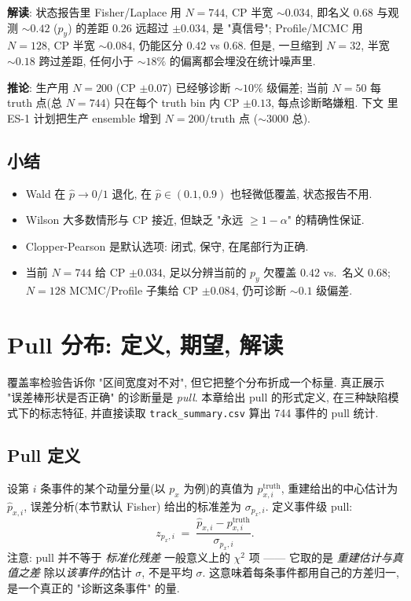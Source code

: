 \textbf{解读}: 状态报告里 Fisher/Laplace 用 $N=744$, CP 半宽 $\sim 0.034$, 即名义 0.68 与观测 $\sim 0.42$ ($p_y$) 的差距 $0.26$ 远超过 $\pm 0.034$, 是 "真信号"; Profile/MCMC 用 $N=128$, CP 半宽 $\sim 0.084$, 仍能区分 $0.42$ vs $0.68$. 但是, 一旦缩到 $N=32$, 半宽 $\sim 0.18$ 跨过差距, 任何小于 $\sim 18\%$ 的偏离都会埋没在统计噪声里.

\textbf{推论}: 生产用 $N=200$ (CP $\pm 0.07$) 已经够诊断 $\sim 10\%$ 级偏差; 当前 $N=50$ 每 truth 点(总 $N=744$) 只在每个 truth bin 内 CP $\pm 0.13$, 每点诊断略嫌粗. 下文  里 ES-1 计划把生产 ensemble 增到 $N=200$/truth 点 ($\sim 3000$ 总).

\subsection{小结}
\label{sec:partIII:coverage_methodology:summary}

\begin{itemize}[nosep]
  \item Wald 在 $\hat p \to 0/1$ 退化, 在 $\hat p \in (0.1, 0.9)$ 也轻微低覆盖, 状态报告不用.
  \item Wilson 大多数情形与 CP 接近, 但缺乏 "永远 $\ge 1 - \alpha$" 的精确性保证.
  \item Clopper-Pearson 是默认选项: 闭式, 保守, 在尾部行为正确.
  \item 当前 $N=744$ 给 CP $\pm 0.034$, 足以分辨当前的 $p_y$ 欠覆盖 $0.42$ vs.\ 名义 $0.68$; $N=128$ MCMC/Profile 子集给 CP $\pm 0.084$, 仍可诊断 $\sim 0.1$ 级偏差.
\end{itemize}


\section{Pull 分布: 定义, 期望, 解读}
\label{sec:partIII:pulls}

覆盖率检验告诉你 "区间宽度对不对", 但它把整个分布折成一个标量. 真正展示 "误差棒形状是否正确" 的诊断量是 \emph{pull}. 本章给出 pull 的形式定义, 在三种缺陷模式下的标志特征, 并直接读取 \texttt{track\_summary.csv} 算出 744 事件的 pull 统计.

\subsection{Pull 定义}
\label{sec:partIII:pulls:definition}

设第 $i$ 条事件的某个动量分量(以 $p_x$ 为例)的真值为 $p_{x,i}^{\mathrm{truth}}$, 重建给出的中心估计为 $\hat p_{x,i}$, 误差分析(本节默认 Fisher) 给出的标准差为 $\sigma_{p_x, i}$. 定义事件级 pull:
\[
  z_{p_x, i} \;=\; \frac{\hat p_{x,i} - p_{x,i}^{\mathrm{truth}}}{\sigma_{p_x, i}}.
\]
注意: pull 并不等于 \emph{标准化残差} 一般意义上的 $\chi^2$ 项 —— 它取的是 \emph{重建估计与真值之差} 除以\emph{该事件的}估计 $\sigma$, 不是平均 $\sigma$. 这意味着每条事件都用自己的方差归一, 是一个真正的 "诊断这条事件" 的量.

